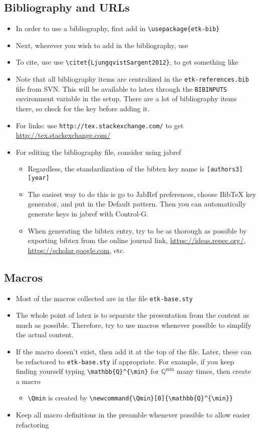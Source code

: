 \documentclass[12pt,etk-draft]{etk-article}
\begin{document}
\subsection{Bibliography and URLs}
\begin{itemize}
\item In order to use a bibliography, first add in \verb!\usepackage{etk-bib}!
\item Next, wherever you wish to add in the bibliography, use \verb!!
\item To cite, use use \verb!\citet{LjungqvistSargent2012}!, to get something like  \cite{LjungqvistSargent2012}
\item Note that all bibliography items are centralized in the \verb!etk-references.bib! file from SVN.  This will be available to latex through the \verb!BIBINPUTS! environment variable in the setup.  There are a lot of bibliography items there, so check for the key before adding it.
\item For links: use \verb!http://tex.stackexchange.com/! to get \url{http://tex.stackexchange.com/}
\item For editing the bibliography file, consider using jabref
\begin{itemize}
\item Regardless, the standardization of the bibtex key name is \verb![authors3][year]!
\item The easiest way to do this is go to JabRef preferences, choose BibTeX key generator, and put in the Default pattern.  Then you can automatically generate keys in jabref with Control-G.
\item When generating the bibtex entry, try to be as thorough as possible by exporting bibtex from the online journal link, \url{https://ideas.repec.org/}, \url{https://scholar.google.com}, etc.
\end{itemize}
\end{itemize}
\subsection{Macros}\label{sec:macros}
\begin{itemize}
\item Most of the macros collected are in the file \verb!etk-base.sty!
\item The whole point of latex is to separate the presentation from the content as much as possible.  Therefore, try to use macros whenever possible to simplify the actual content.
\item If the macro doesn't exist, then add it at the top of the file.  Later, these can be refactored to \verb!etk-base.sty! if appropriate.  For example, if you keep finding yourself typing \verb!\mathbb{Q}^{\min}! for $\mathbb{Q}^{\min}$ many times, then create a macro
\begin{itemize}
\item  \verb!\Qmin! is created by \verb!\newcommand{\Qmin}[0]{\mathbb{Q}^{\min}}!
\end{itemize}
\item Keep all macro definitions in the preamble whenever possible to allow easier refactoring
\end{itemize}
\end{document}
